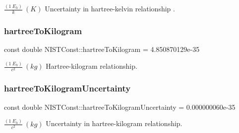 $\frac{(1\ E_h)}{k} \ (K)$ Uncertainty in hartree-\/kelvin relationship . \mbox{\label{group___n_i_s_t_const-_hartree_ga1184624f36892653b10c2bb068541f82}} 
\subsubsection{\texorpdfstring{hartree\+To\+Kilogram}{hartreeToKilogram}}
{\footnotesize\ttfamily const double N\+I\+S\+T\+Const\+::hartree\+To\+Kilogram = 4.\+850870129e-\/35}

$\frac{(1\ E_h)}{c^2} \ (kg)$ Hartree-\/kilogram relationship. \mbox{\label{group___n_i_s_t_const-_hartree_ga88a5e0e81776199fdc7d4b5a424196a8}} 
\subsubsection{\texorpdfstring{hartree\+To\+Kilogram\+Uncertainty}{hartreeToKilogramUncertainty}}
{\footnotesize\ttfamily const double N\+I\+S\+T\+Const\+::hartree\+To\+Kilogram\+Uncertainty = 0.\+000000060e-\/35}

$\frac{(1\ E_h)}{c^2} \ (kg)$ Uncertainty in hartree-\/kilogram relationship. 